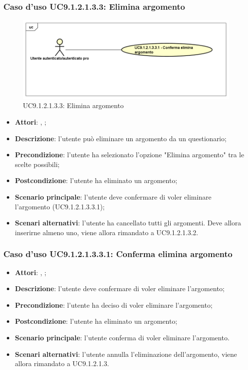						\subsubsection{Caso d'uso UC9.1.2.1.3.3: Elimina argomento}
						\label{UC9.1.2.1.3.3}
						\begin{figure}[h]
							\centering
							\includegraphics[scale=0.5,keepaspectratio]{UML/UC9_1_2_1_3_3.png}
							\caption{UC9.1.2.1.3.3: Elimina argomento}
						\end{figure}
						\FloatBarrier
						\begin{itemize}
							\item \textbf{Attori}: \uau, \uaupro;
							\item \textbf{Descrizione}: l'utente può eliminare un argomento da un questionario;
							\item \textbf{Precondizione}: l'utente ha selezionato l'opzione "Elimina argomento" tra le scelte possibili;
							\item \textbf{Postcondizione}: l'utente ha eliminato un argomento;
							\item \textbf{Scenario principale}: l'utente deve confermare di voler eliminare l'argomento (UC9.1.2.1.3.3.1); 
							\item \textbf{Scenari alternativi}: l'utente ha cancellato tutti gli argomenti. Deve allora inserirne almeno uno, viene allora rimandato a UC9.1.2.1.3.2.
						\end{itemize}
						
							\subsubsection{Caso d'uso UC9.1.2.1.3.3.1: Conferma elimina argomento}
							\label{UC9.1.2.1.3.3.1}
							\begin{itemize}
								\item \textbf{Attori}: \uau, \uaupro;
								\item \textbf{Descrizione}: l'utente deve confermare di voler eliminare l'argomento;
								\item \textbf{Precondizione}: l'utente ha deciso di voler eliminare l'argomento;
								\item \textbf{Postcondizione}: l'utente ha eliminato un argomento;
								\item \textbf{Scenario principale}: l'utente conferma di voler eliminare l'argomento. 
								\item \textbf{Scenari alternativi}: l'utente annulla l'eliminazione dell'argomento, viene allora rimandato a UC9.1.2.1.3.
							\end{itemize}						
						
